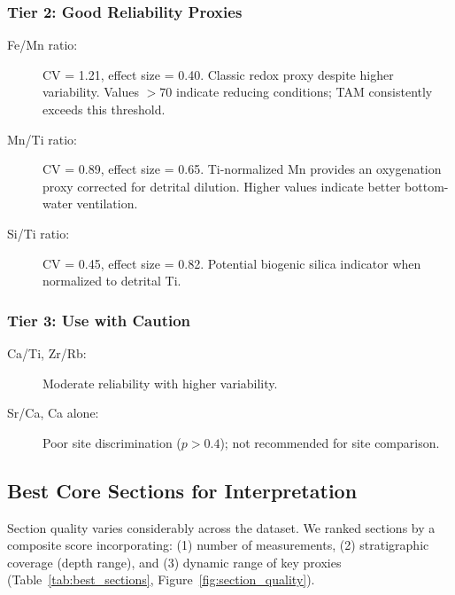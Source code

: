 \subsubsection{Tier 2: Good Reliability Proxies}

\begin{description}
\item[Fe/Mn ratio:] CV = 1.21, effect size = 0.40. Classic redox proxy despite higher variability. Values $>70$ indicate reducing conditions; TAM consistently exceeds this threshold.

\item[Mn/Ti ratio:] CV = 0.89, effect size = 0.65. Ti-normalized Mn provides an oxygenation proxy corrected for detrital dilution. Higher values indicate better bottom-water ventilation.

\item[Si/Ti ratio:] CV = 0.45, effect size = 0.82. Potential biogenic silica indicator when normalized to detrital Ti.
\end{description}

\subsubsection{Tier 3: Use with Caution}

\begin{description}
\item[Ca/Ti, Zr/Rb:] Moderate reliability with higher variability.
\item[Sr/Ca, Ca alone:] Poor site discrimination ($p > 0.4$); not recommended for site comparison.
\end{description}

\subsection{Best Core Sections for Interpretation}

Section quality varies considerably across the dataset. We ranked sections by a composite score incorporating: (1) number of measurements, (2) stratigraphic coverage (depth range), and (3) dynamic range of key proxies (Table~\ref{tab:best_sections}, Figure~\ref{fig:section_quality}).

